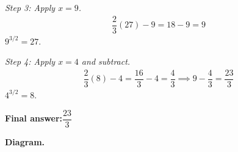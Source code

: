 \documentclass[11pt]{article}
\begin{document}
\textit{Step 3: Apply \( x = 9 \).}
\[\begin{gathered}
\dfrac{2}{3}(27) - 9 = 18 - 9 = 9
\end{gathered}\]
\( 9^{3/2} = 27 \).

\textit{Step 4: Apply \( x = 4 \) and subtract.}
\[\begin{gathered}
\dfrac{2}{3}(8) - 4 = \dfrac{16}{3} - 4 = \dfrac{4}{3} \implies 9 - \dfrac{4}{3} = \dfrac{23}{3}
\end{gathered}\]
\( 4^{3/2} = 8 \).

\begin{answerbox}
\textbf{Final answer:}\quad \(\displaystyle \dfrac{23}{3}\)
\end{answerbox}
\textbf{Diagram.}

\begin{center}
\end{center}
\end{document}
